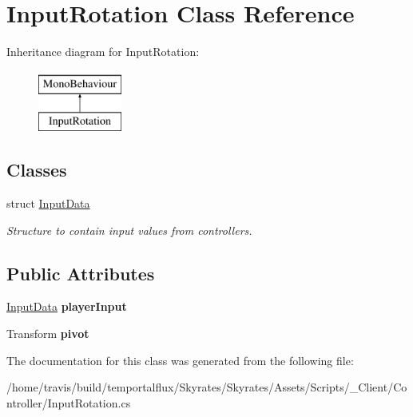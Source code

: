 \hypertarget{class_input_rotation}{\section{Input\-Rotation Class Reference}
\label{class_input_rotation}
}
Inheritance diagram for Input\-Rotation\-:\begin{figure}[H]
\begin{center}
\leavevmode
\includegraphics[height=2.000000cm]{class_input_rotation}
\end{center}
\end{figure}
\subsection*{Classes}
\begin{DoxyCompactItemize}
\item 
struct \hyperlink{struct_input_rotation_1_1_input_data}{Input\-Data}
\begin{DoxyCompactList}\small\item\em Structure to contain input values from controllers. \end{DoxyCompactList}\end{DoxyCompactItemize}
\subsection*{Public Attributes}
\begin{DoxyCompactItemize}
\item 
\hypertarget{class_input_rotation_ac14f866998996184587e9d37cc5017f4}{\hyperlink{struct_input_rotation_1_1_input_data}{Input\-Data} {\bfseries player\-Input}}\label{class_input_rotation_ac14f866998996184587e9d37cc5017f4}

\item 
\hypertarget{class_input_rotation_a2698edf3028a376348dc96448d84a07f}{Transform {\bfseries pivot}}\label{class_input_rotation_a2698edf3028a376348dc96448d84a07f}

\end{DoxyCompactItemize}


The documentation for this class was generated from the following file\-:\begin{DoxyCompactItemize}
\item 
/home/travis/build/temportalflux/\-Skyrates/\-Skyrates/\-Assets/\-Scripts/\-\_\-\-Client/\-Controller/Input\-Rotation.\-cs\end{DoxyCompactItemize}
